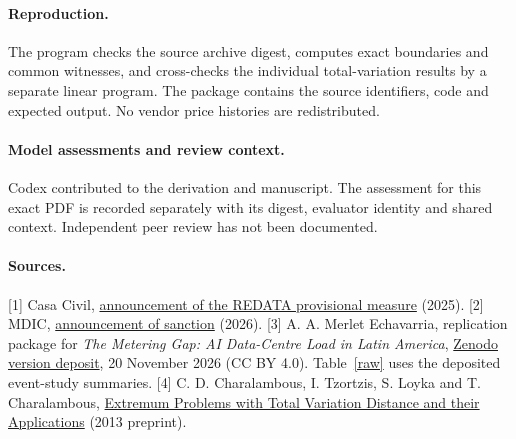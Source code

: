 \documentclass[11pt]{article}
\begin{document}
\paragraph{Reproduction.} The program checks the source archive digest, computes exact boundaries and common witnesses, and cross-checks the individual total-variation results by a separate linear program. The package contains the source identifiers, code and expected output. No vendor price histories are redistributed.
\paragraph{Model assessments and review context.} Codex contributed to the derivation and manuscript. The assessment for this exact PDF is recorded separately with its digest, evaluator identity and shared context. Independent peer review has not been documented.

\paragraph{Sources.}
[1] Casa Civil, \href{https://www.gov.br/casacivil/pt-br/assuntos/noticias/2025/setembro/governo-federal-edita-mp-para-instituir-regime-especial-de-tributacao-para-servicos-de-datacenter}{announcement of the REDATA provisional measure} (2025).
[2] MDIC, \href{https://www.gov.br/mdic/pt-br/assuntos/noticias/2026/setembro/presidente-sanciona-o-redata-que-estimula-datacenters-e-desenvolvimento-tecnologico-no-brasil}{announcement of sanction} (2026).
[3] A. A. Merlet Echavarria, replication package for \emph{The Metering Gap: AI Data-Centre Load in Latin America}, \href{https://doi.org/10.5281/zenodo.24405076}{Zenodo version deposit}, 20 November 2026 (CC BY 4.0). Table~\ref{raw} uses the deposited event-study summaries.
[4] C. D. Charalambous, I. Tzortzis, S. Loyka and T. Charalambous, \href{https://arxiv.org/abs/1301.4763}{Extremum Problems with Total Variation Distance and their Applications} (2013 preprint).
\end{document}

